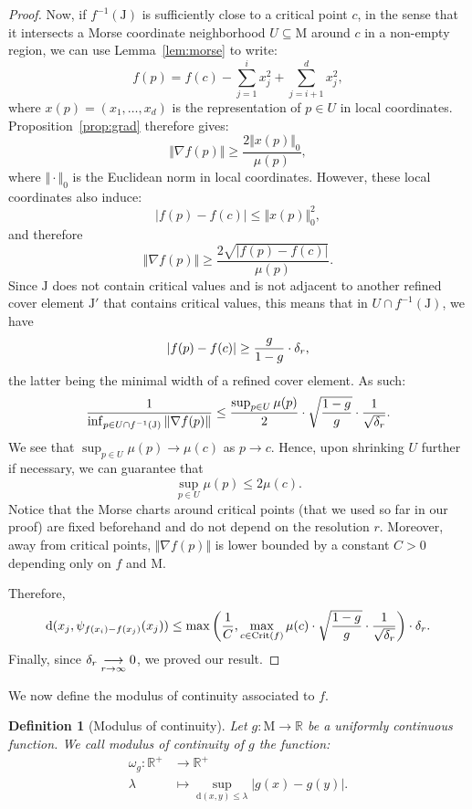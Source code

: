 \documentclass[pdflatex,sn-mathphys-ay]{sn-jnl}%
\newtheorem{definition}{Definition}
\newcommand{\man}{\mathrm{M}}
\newcommand{\dis}{\mathrm{d}}
\newcommand{\critic}{{\mathrm {Crit}}}
\newcommand{\coverwidth}{\change{\delta_r}}
\newcommand{\R}{\mathbb{R}}
\newcommand{\preim}[2]{#1^{-1}(#2)}
\newcommand{\change}[1]{\noindent #1}
\theoremstyle{thmstyleone}%
\begin{document}
\begin{proof}
Now, if $\preim{f}{\mathrm{J}}$ is sufficiently close to a critical point $c$, in the sense that it intersects a Morse coordinate neighborhood $U\subseteq\man$ around $c$ in a non-empty region, we can use Lemma~\ref{lem:morse} to write:
 $$f(p)=f(c)-\sum_{j=1}^ix_j^2+\sum_{j=i+1}^dx_j^2,$$
where $x(p)=(x_1,\dots,x_d)$ is the representation of $p\in U$ in local coordinates. Proposition~\ref{prop:grad} therefore gives:
$$\Vert\nabla f(p)\Vert\geq\frac{2\Vert x(p)\Vert_0}{\mu(p)},$$
where $\Vert\cdot\Vert_0$ is the Euclidean norm in local coordinates. 
However, these local coordinates also induce:
$$|f(p)-f(c)|\leq \Vert x(p)\Vert_0^2,$$
and therefore %
$$\Vert\nabla f(p)\Vert\geq\frac{2\sqrt{|f(p)-f(c)|}}{\mu(p)}.$$ 
Since $\mathrm{J}$ does not contain critical values and is not adjacent to another refined cover element $\mathrm{J}'$ that contains critical values, this means that in $U\cap \preim{f}{\mathrm{J}}$, we have 
$$|f(p)-f(c)|\geq \frac{g}{1-g}\cdot\coverwidth,$$
the latter being the minimal width of a refined cover element. 
As such:
$$\frac{1}{\inf_{p\in U\cap \preim{f}{\mathrm{J}}}\Vert\nabla f(p)\Vert}\leq \frac{\sup_{p\in U}\mu(p)}{2}\cdot\sqrt{\frac{1-g}{g}}\cdot\frac{1}{\sqrt{\coverwidth}}.$$
We see that $\sup_{p\in U}\mu(p)\rightarrow\mu(c)$ as $p\rightarrow c$. Hence, upon shrinking $U$ further if necessary, we can guarantee that
$$\sup_{p\in U}\mu(p)\leq 2\mu(c).$$
Notice that the Morse charts around critical points (that we used so far in our proof) are fixed beforehand and do not depend on the resolution $r$. Moreover, away from critical points, $\Vert\nabla f(p)\Vert$ is lower bounded by a constant $C>0$ depending only on $f$ and $\man$. %

Therefore,
%
$$\dis(x_j,\psi_{f(x_i)-f(x_j)}(x_j))\leq \max\left(\frac{1}{C},\max_{c\in\critic(f)}\mu(c)\cdot\sqrt{\frac{1-g}{g}}\cdot\frac{1}{\sqrt{\coverwidth}}\right)\cdot\coverwidth.$$
%
Finally, since $\coverwidth\underset{r\rightarrow\infty}{\longrightarrow}0$, we proved our result.
\end{proof}

We now define the modulus of continuity associated to $f$.
\begin{definition}[\change{Modulus of continuity}]
Let $g\colon\man\rightarrow\R$ be a uniformly continuous function. We call modulus of continuity of $g$ the function:
 \begin{align*}
     \omega_g\colon\R^+&\longrightarrow\R^+\\
     \lambda&\longmapsto \sup_{\dis(x,y)\leq\lambda}|g(x)-g(y)| .
 \end{align*}
\end{definition}
\end{document}
